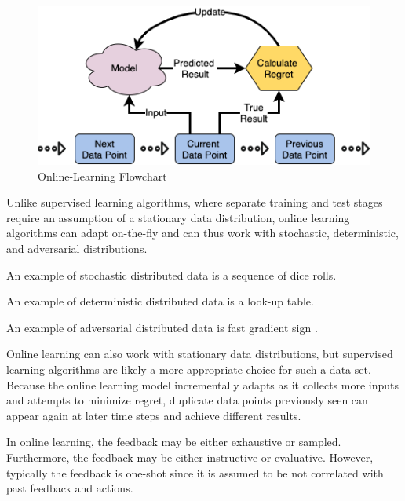 \documentclass[11pt]{article}
\begin{document}
\begin{figure}[H]
    \centering
    \includegraphics[width=0.7\linewidth]{figures/online learning.png}
    \caption{Online-Learning Flowchart}
    \label{fig:online_learning}
\end{figure}

Unlike supervised learning algorithms, where separate training and test stages require an assumption of a stationary data distribution, online learning algorithms can adapt on-the-fly and can thus work with stochastic, deterministic, and adversarial distributions. 

\normalfont 

An example of stochastic distributed data is a sequence of dice rolls.

\normalfont 

An example of deterministic distributed data is a look-up table.

\normalfont 

An example of adversarial distributed data is fast gradient sign \cite{adversarial_ex}.

Online learning can also work with stationary data distributions, but supervised learning algorithms are likely a more appropriate choice for such a data set. Because the online learning model incrementally adapts as it collects more inputs and attempts to minimize regret, duplicate data points previously seen can appear again at later time steps and achieve different results. 

In online learning, the feedback may be either exhaustive or sampled. Furthermore, the feedback may be either instructive or evaluative. However, typically the feedback is one-shot since it is assumed to be not correlated with past feedback and actions. 
\end{document}
